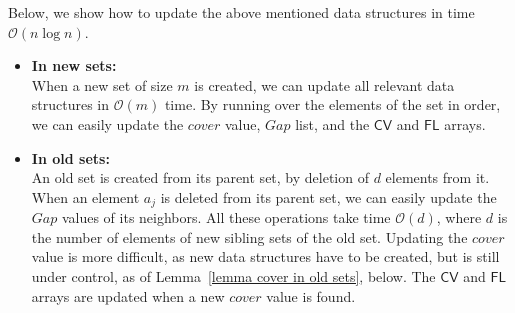 \documentclass[preprint,12pt]{elsarticle}
\newcommand{\cv}{\textsf{CV}}
\newcommand{\fl}{\textsf{FL}}
\newcommand{\cO}{\ensuremath{\mathcal{O}}}
\newcommand{\gaplist}{\ensuremath{\mathit{Gap}}}
\newcommand{\covervalue}{\ensuremath{\mathit{cover}}}
\begin{document}
Below, we show how to update the above mentioned data structures in time $\cO(n\log n)$.
\begin{itemize}
  \item \textbf{In new sets:}\\
  When a new set of size $m$ is created, we can update all relevant data structures in $\cO(m)$ time.
  By running over the elements of the set in order, we can easily update the $\covervalue$ value, $\gaplist$ list, 
  and the $\cv$ and $\fl$ arrays.
  \item \textbf{In old sets:}\\
An old set is created from its parent set, by deletion of $d$ elements from it.
When an element $a_j$ is deleted from its parent set, we can easily update the $\gaplist$ values of its neighbors.
All these operations take time $\cO(d)$, where $d$ is the number of elements of new sibling sets of the old set.
Updating the $\covervalue$ value is more difficult, as new data structures have to be created, but is still under
control, as of Lemma~\ref{lemma cover in old sets}, below. 
The $\cv$ and $\fl$ arrays are updated when a new $\covervalue$ value is found.
\end{itemize}
\end{document}
